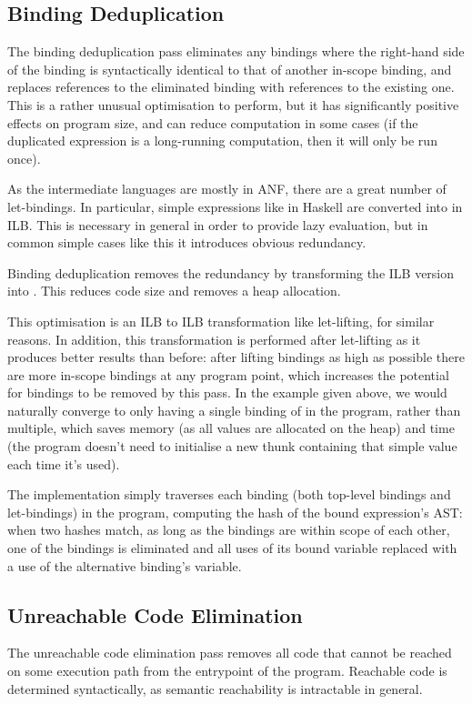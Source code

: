 \documentclass[dissertation.tex]{subfiles}
\begin{document}
{    \subsection{Binding Deduplication}\label{sec:binding-dedupe}
    {
        The binding deduplication pass eliminates any bindings where the right-hand side of the binding is syntactically identical to that of another in-scope binding, and replaces references to the eliminated binding with references to the existing one. This is a rather unusual optimisation to perform, but it has significantly positive effects on program size, and can reduce computation in some cases (if the duplicated expression is a long-running computation, then it will only be run once).

        As the intermediate languages are mostly in ANF, there are a great number of let-bindings. In particular, simple expressions like  in Haskell are converted into  in ILB. This is necessary in general in order to provide lazy evaluation, but in common simple cases like this it introduces obvious redundancy.
        
        Binding deduplication removes the redundancy by transforming the ILB version into . This reduces code size and removes a heap allocation.

        This optimisation is an ILB to ILB transformation like let-lifting, for similar reasons. In addition, this transformation is performed after let-lifting as it produces better results than before: after lifting bindings as high as possible there are more in-scope bindings at any program point, which increases the potential for bindings to be removed by this pass. In the  example given above, we would naturally converge to only having a single binding of  in the program, rather than multiple, which saves memory (as all values are allocated on the heap) and time (the program doesn't need to initialise a new thunk containing that simple value each time it's used).

        The implementation simply traverses each binding (both top-level bindings and let-bindings) in the program, computing the hash of the bound expression's AST: when two hashes match, as long as the bindings are within scope of each other, one of the bindings is eliminated and all uses of its bound variable replaced with a use of the alternative binding's variable.
    }
    \subsection{Unreachable Code Elimination}\label{sec:unreachable-elim}
    {
        The unreachable code elimination pass removes all code that cannot be reached on some execution path from the entrypoint of the program. Reachable code is determined syntactically, as semantic reachability is intractable in general.

}}
\end{document}
